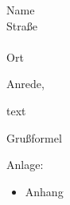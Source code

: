 \documentclass[12pt,a4paper]{dinbrief}
\date{Datum}
\newcommand{\anhang}[1]{{Anlage:\\#1}}
\newcommand{\recipientName}{Name}
\newcommand{\recipientStreet}{Stra{\ss}e}
\newcommand{\recipientLocation}{Ort}
\begin{document}
\begin{letter}{\recipientName\\
                \recipientStreet\\\\
                \recipientLocation}
\opening{Anrede,}

text

\closing{Grußformel}
\anhang{
\begin{itemize}
  \item Anhang
\end{itemize}
}

\end{letter}
\end{document}
